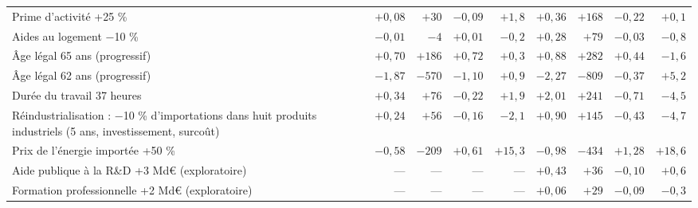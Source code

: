 \begin{tabular}{p{6.2cm}rrrr|rrrr}
Prime d'activité +25 \% & $+0{,}08$ & $+30$ & $-0{,}09$ & $+1{,}8$ & $+0{,}36$ & $+168$ & $-0{,}22$ & $+0{,}1$\\
Aides au logement −10 \% & $-0{,}01$ & $-4$ & $+0{,}01$ & $-0{,}2$ & $+0{,}28$ & $+79$ & $-0{,}03$ & $-0{,}8$\\
Âge légal 65 ans (progressif) & $+0{,}70$ & $+186$ & $+0{,}72$ & $+0{,}3$ & $+0{,}88$ & $+282$ & $+0{,}44$ & $-1{,}6$\\
Âge légal 62 ans (progressif) & $-1{,}87$ & $-570$ & $-1{,}10$ & $+0{,}9$ & $-2{,}27$ & $-809$ & $-0{,}37$ & $+5{,}2$\\
Durée du travail 37 heures & $+0{,}34$ & $+76$ & $-0{,}22$ & $+1{,}9$ & $+2{,}01$ & $+241$ & $-0{,}71$ & $-4{,}5$\\
Réindustrialisation : −10 \% d'importations dans huit produits industriels (5 ans, investissement, surcoût) & $+0{,}24$ & $+56$ & $-0{,}16$ & $-2{,}1$ & $+0{,}90$ & $+145$ & $-0{,}43$ & $-4{,}7$\\
Prix de l'énergie importée +50 \% & $-0{,}58$ & $-209$ & $+0{,}61$ & $+15{,}3$ & $-0{,}98$ & $-434$ & $+1{,}28$ & $+18{,}6$\\
Aide publique à la R\&D +3 Md€ (exploratoire) & --- & --- & --- & --- & $+0{,}43$ & $+36$ & $-0{,}10$ & $+0{,}6$\\
Formation professionnelle +2 Md€ (exploratoire) & --- & --- & --- & --- & $+0{,}06$ & $+29$ & $-0{,}09$ & $-0{,}3$\\\bottomrule\end{tabular}